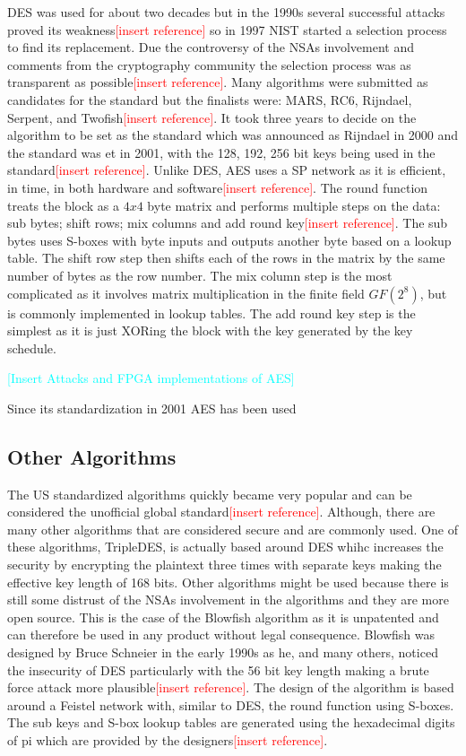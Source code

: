 \documentclass[12pt,twoside,a4paper]{report}
\begin{document}
    DES was used for about two decades but in the 1990s several successful attacks proved its weakness\textcolor{red}{[insert reference]} so in 1997 NIST started a selection process to find its replacement. Due the controversy of the NSAs involvement and comments from the cryptography community the selection process was as transparent as possible\textcolor{red}{[insert reference]}. Many algorithms were submitted as candidates for the standard but the finalists were: MARS, RC6, Rijndael, Serpent, and Twofish\textcolor{red}{[insert reference]}. It took three years to decide on the algorithm to be set as the standard which was announced as Rijndael in 2000 and the standard was et in 2001, with the 128, 192, 256 bit keys being used in the standard\textcolor{red}{[insert reference]}. Unlike DES, AES uses a SP network as it is efficient, in time, in both hardware and software\textcolor{red}{[insert reference]}. The round function treats the block as a $4x4$ byte matrix and performs multiple steps on the data: sub bytes; shift rows; mix columns and add round key\textcolor{red}{[insert reference]}. The sub bytes uses S-boxes with byte inputs and outputs another byte based on a lookup table. The shift row step then shifts each of the rows in the matrix by the same number of bytes as the row number. The mix column step is the most complicated as it involves matrix multiplication in the finite field $GF(2^8)$, but is commonly implemented in lookup tables. The add round key step is the simplest as it is just XORing the block with the key generated by the key schedule.
    
    \textcolor{cyan}{[Insert Attacks and FPGA implementations of AES]}
    
    Since its standardization in 2001 AES has been used      
    
    \subsection{Other Algorithms}
    The US standardized algorithms quickly became very popular and can be considered the unofficial global standard\textcolor{red}{[insert reference]}. Although, there are many other algorithms that are considered secure and are commonly used. One of these algorithms, TripleDES, is actually based around DES whihc increases the security by encrypting the plaintext three times with separate keys making the effective key length of 168 bits. Other algorithms might be used because there is still some distrust of the NSAs involvement in the algorithms and they are more open source. This is the case of the Blowfish algorithm as it is unpatented and can therefore be used in any product without legal consequence. Blowfish was designed by Bruce Schneier in the early 1990s as he, and many others, noticed the insecurity of DES particularly with the 56 bit key length making a brute force attack more plausible\textcolor{red}{[insert reference]}. The design of the algorithm is based around a Feistel network with, similar to DES, the round function using S-boxes. The sub keys and S-box lookup tables are generated using the hexadecimal digits of pi which are provided by the designers\textcolor{red}{[insert reference]}.
    
\end{document}
